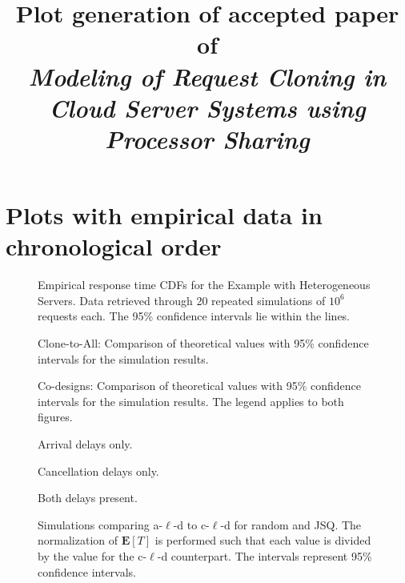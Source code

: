 \documentclass[]{article}
\begin{document}
\title{Plot generation of accepted paper of \\ \emph{Modeling of Request Cloning in Cloud Server Systems using Processor Sharing}}

\maketitle

\section*{Plots with empirical data in chronological order}

\begin{figure}[H]
	\centering
	
	\caption{Empirical response time CDFs for the Example with Heterogeneous Servers. Data retrieved through 20 repeated simulations of $10^6$ requests each. The 95\% confidence intervals lie within the lines.}
	\label{fig:gg1-results-ps}
\end{figure}


\begin{figure}[H]
	\centering
	
	\caption{Clone-to-All: Comparison of theoretical values with 95\% confidence intervals for the simulation results.}
	\label{fig:clone-to-all-evaluation}
\end{figure}

  \begin{figure}[H]
	\centering
	
	
	
	\caption{Co-designs: Comparison of theoretical values with 95\% confidence intervals for the simulation results. The legend applies to both figures.}
	\label{fig:co-design}
\end{figure}

\begin{figure}[H] 
	\centering
	
	\caption{Arrival delays only.}
\end{figure}

\begin{figure}[H]
	\centering
	
	\caption{Cancellation delays only.}
\end{figure}

\begin{figure}[H]
	\centering
	
	\caption{Both delays present.}
\end{figure}

\begin{figure}[H]
	\centering
	
	
	
	\caption{Simulations comparing a-$\ell$-d to c-$\ell$-d for random and JSQ. The normalization of $\mathbf{E}[T]$ is performed such that each value is divided by the value for the c-$\ell$-d counterpart. The intervals represent 95\% confidence intervals.}
	\label{fig:nonsync-vs-sync}
\end{figure}
\end{document}
